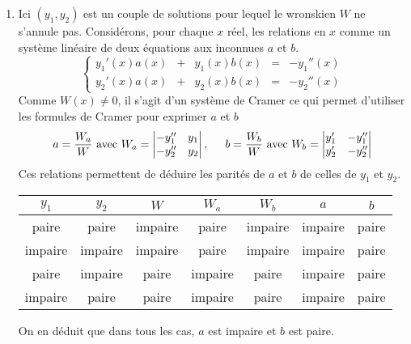 \begin{enumerate}
\begin{enumerate}
 \item Ici $(y_1,y_2)$ est un couple de solutions pour lequel le wronskien $W$ ne s'annule pas. Considérons, pour chaque $x$ réel, les relations en $x$ comme un système linéaire de deux équations aux inconnues $a$ et $b$.
\[
\left\lbrace 
\begin{alignedat}{3}
 y_1'(x) a(x) & {}+{} & y_1(x)b(x) & = & -y_1''(x)\\
 y_2'(x) a(x) & {}+{} & y_2(x)b(x) & = &  -y_2''(x)
\end{alignedat}
\right. 
\]
Comme $W(x)\neq 0$, il s'agit d'un système de Cramer ce qui permet d'utiliser les formules de Cramer pour exprimer $a$ et $b$
\[
 a = \frac{W_a}{W} \text{ avec } W_a =
 \begin{vmatrix}
  -y_1'' & y_1 \\ -y_2'' & y_2
 \end{vmatrix}
,\hspace{0.5cm}
 b = \frac{W_b}{W} \text{ avec } W_b =
 \begin{vmatrix}
  y_1' & -y_1'' \\ y_2' & -y_2''
 \end{vmatrix}
\]
Ces relations permettent de déduire les parités de $a$ et $b$ de celles de $y_1$ et $y_2$.
\begin{center}
\renewcommand{\arraystretch}{1.1}
\begin{tabular}{|c|c|c|c|c|c|c|} \hline 
$y_1$  & $y_2$  & $W$    & $W_a$  & $W_b$  & $a$    & $b$  \\ \hline
paire   & paire   & impaire & paire   & impaire & impaire & paire \\ \hline
impaire & impaire & impaire & paire   & impaire & impaire & paire \\ \hline
paire   & impaire & paire   & impaire & paire   & impaire & paire \\ \hline
impaire & paire   & paire   & impaire & paire   & impaire & paire \\ \hline
\end{tabular} 
\end{center}

On en déduit que dans tous les cas, $a$ est impaire et $b$ est paire.
\end{enumerate}

 \end{enumerate}
